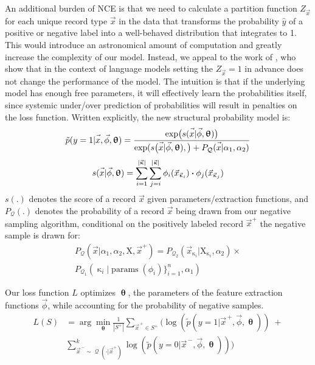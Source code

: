 \documentclass[letterpaper]{article}
\newcommand{\vect}[1]{\vec{#1}}
\DeclareMathOperator{\q}{{\mathcal{Q}}}
\newcommand{\dotp}{\boldsymbol{\cdot} }
\begin{document}
An additional burden of NCE is that we need to calculate a partition function $Z_{\vec{x}}$ for each unique record type $\vec{x}$ in the data that transforms the probability $\hat y$ of a positive or negative label into a well-behaved distribution that integrates to 1.
This would introduce an astronomical amount of computation and greatly increase the complexity of our model.
Instead, we appeal to the work of \cite{fastnnlang},
who show that in the context of language models setting the $Z_{\vec{x}}=1$ in advance does not change the performance of the model.
The intuition is that if the underlying model has enough free parameters, it will effectively learn the probabilities itself, since systemic under/over prediction of probabilities will result in penalties on the loss function.
Written explicitly, the new structural probability model is:
\begin{equation}
\tilde p(y=1|\vec{x\vphantom{phi}},\vec{\phi}, \bm\uptheta) = \frac{\exp\bigl(s(\vec{x\vphantom{phi}}|\vec{\phi}, \bm\uptheta) \bigr)}{\exp( s\bigl(\vec{x\vphantom{phi}}|\vec{\phi}, \bm\uptheta), \bigr) + P_{\q}(\vec{\vphantom{phi}x}| \alpha_1,\alpha_2)}
\end{equation}
\begin{equation}
s(\vec{x\vphantom{phi}}|\vec{\phi}, \bm\uptheta) =
                       \sum_{i =1}^{|\vect{\upkappa}|} \sum_{j=i}^{|\vect{\upkappa}|}   \phi_i( \vect{x}_{\vect{\upkappa}_i}) \dotp \phi_j( \vect{x}_{\vect{\upkappa}_j})
\end{equation}
$s(.)$ denotes the score of a record $\vec{x}$ given parameters/extraction functions,
and $P_{\q}(.)$ denotes the probability of a record $\vec{x}$ being drawn from our negative sampling algorithm, conditional on the positively labeled record $\vect{x}^+$ the negative sample is drawn for:
\begin{align*}
P_{\q}(\vec{x}|\alpha_1,\alpha_2,\mathrm{X},\vect{x}^+) = P_{\q_2}(\vec{x}_{\upkappa_i}|\mathrm{X}_{\upkappa_i},\alpha_2)\times \\ P_{\q_1}(\upkappa_i|\operatorname{params}(\phi_i)\}_{i=1}^n,\alpha_1)
\end{align*}

Our loss function $L$ optimizes $\bm\uptheta$, the parameters of the feature extraction functions $\vect\phi$, while accounting for the probability of negative samples.
\begin{align*}
L(S) & = \arg\min_{\bm\uptheta}   \frac{1}{|S^+|} \sum_{\vect{x}^{\,+} \in S^+} \Big(\log(\tilde p(y=1|\vect{x}^{\,+},\vec{\phi},\bm\uptheta   ) ) \; + \\
&  \sum_{\vect{x}^{\,-}  \sim \q(\cdot|\vect{x}^+)}^k \log(\tilde p(y=0|\vect{x}^{\,-},\vec{\phi},\bm\uptheta   )) \Big)
\end{align*}
\end{document}
